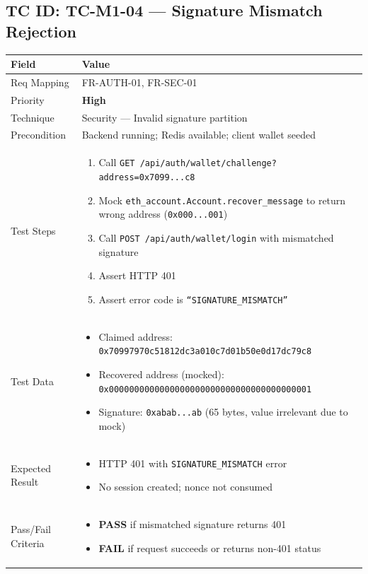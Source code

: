 \documentclass[12pt,a4paper]{article}
\newcommand{\sevhigh}{\textcolor{severityhigh}{\textbf{High}}}
\newcommand{\passresult}{\textcolor{passgreen}{\textbf{PASS}}}
\newcommand{\failresult}{\textcolor{failred}{\textbf{FAIL}}}
\begin{document}
\vspace{0.8cm}

\subsection{TC ID: TC-M1-04 --- Signature Mismatch Rejection}

\begin{tabular}{|p{}|p{}|}
\hline
\rowcolor{lightblue} \textbf{Field} & \textbf{Value} \\
\hline
Req Mapping & FR-AUTH-01, FR-SEC-01 \\
\hline
Priority & \sevhigh \\
\hline
Technique & Security --- Invalid signature partition \\
\hline
Precondition & Backend running; Redis available; client wallet seeded \\
\hline
Test Steps &
\begin{enumerate}[nosep, leftmargin=*]
  \item Call \texttt{GET /api/auth/wallet/challenge?address=0x7099...c8}
  \item Mock \texttt{eth\_account.Account.recover\_message} to return wrong address (\texttt{0x000...001})
  \item Call \texttt{POST /api/auth/wallet/login} with mismatched signature
  \item Assert HTTP 401
  \item Assert error code is \texttt{``SIGNATURE\_MISMATCH''}
\end{enumerate} \\
\hline
Test Data &
\begin{itemize}[nosep, leftmargin=*]
  \item Claimed address: \texttt{0x70997970c51812dc3a010c7d01b50e0d17dc79c8}
  \item Recovered address (mocked): \texttt{0x0000000000000000000000000000000000000001}
  \item Signature: \texttt{0xabab...ab} (65 bytes, value irrelevant due to mock)
\end{itemize} \\
\hline
Expected Result &
\begin{itemize}[nosep, leftmargin=*]
  \item HTTP 401 with \texttt{SIGNATURE\_MISMATCH} error
  \item No session created; nonce not consumed
\end{itemize} \\
\hline
Pass/Fail Criteria &
\begin{itemize}[nosep, leftmargin=*]
  \item \passresult{} if mismatched signature returns 401
  \item \failresult{} if request succeeds or returns non-401 status
\end{itemize} \\
\hline
\end{tabular}
\end{document}
